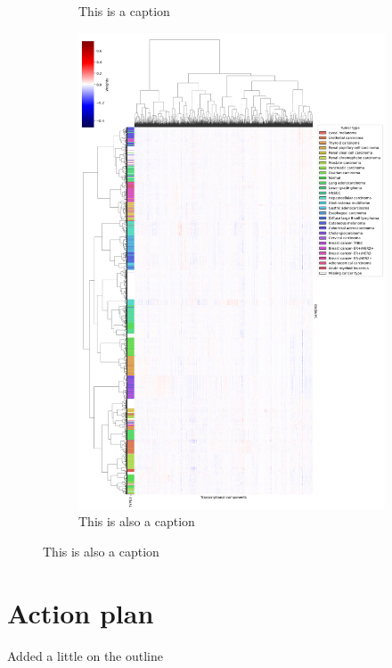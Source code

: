 \begin{figure}[H]
\begin{subfigure}[t]{.3\textwidth}
        \caption{This is a caption}
        \label{plt:mm_hm_miss_tt}
    \end{subfigure}\hspace{3cm}
    \begin{subfigure}[t]{.3\textwidth}
        \centering
        \includegraphics[scale=0.3]{images/mm_heatmap.png}
        \caption{This is also a caption}
        \label{plt:mm_hm}
    \end{subfigure}
\end{figure}

\section{Action plan}
Added a little on the outline
